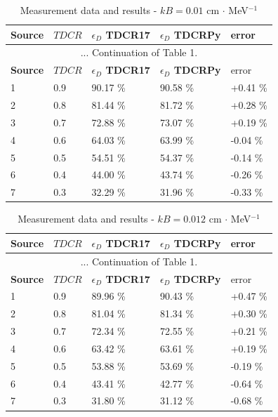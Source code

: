 \documentclass[12pt]{iopart}
\begin{document}
\begingroup
\footnotesize
\begin{longtable}[l]{| p{} | p{} | p{} |p{} |p{} |} 
\caption{Measurement data and results - $kB = 0.01$ cm $\cdot$ MeV$^{-1}$}
\label{Table1} \\ 
\hline
\textbf{Source} & \textbf{$TDCR$} & \textbf{$\epsilon_{D}$ TDCR17} & \textbf{$\epsilon_{D}$ TDCRPy} & error \\ 
\endfirsthead
\multicolumn{5}{c}{... Continuation of Table 1.}\\ 
\hline
 \textbf{Source} & \textbf{$TDCR$} & \textbf{$\epsilon_{D}$ TDCR17} & \textbf{$\epsilon_{D}$ TDCRPy} & error \\   \hline 
\endhead
\hline
 1 &  0.9  &  90.17 \% &   90.58 \% &  +0.41 \% \\
 2 &  0.8  &  81.44 \% &   81.72 \% &  +0.28 \% \\
 3 &  0.7  &  72.88 \% &   73.07 \% &  +0.19 \% \\
 4 &  0.6  &  64.03 \% &   63.99 \% &  -0.04 \% \\
 5 &  0.5  &  54.51 \% &   54.37 \% &  -0.14 \% \\
 6 &  0.4  &  44.00 \% &   43.74 \% &  -0.26 \% \\
 7 &  0.3  &  32.29 \% &   31.96 \% &  -0.33 \% \\
\hline
\end{longtable} 
\endgroup

\begingroup
\footnotesize
\begin{longtable}[l]{| p{} | p{} |p{} |p{} |p{} |} 
\caption{Measurement data and results - $kB = 0.012$ cm $\cdot$ MeV$^{-1}$}
\label{Table1} \\ 
\hline
\textbf{Source} & \textbf{$TDCR$} & \textbf{$\epsilon_{D}$ TDCR17} & \textbf{$\epsilon_{D}$ TDCRPy} & error \\ 
\endfirsthead
\multicolumn{5}{c}{... Continuation of Table 1.}\\ 
\hline
 \textbf{Source} & \textbf{$TDCR$} & \textbf{$\epsilon_{D}$ TDCR17} & \textbf{$\epsilon_{D}$ TDCRPy} & error \\   \hline 
\endhead
\hline
 1 & 0.9   &   89.96 \% &   90.43 \% & +0.47 \% \\
 2 & 0.8   &   81.04 \% &   81.34 \% & +0.30 \% \\
 3 & 0.7   &   72.34 \% &   72.55 \% & +0.21 \% \\
 4 & 0.6   &   63.42 \% &   63.61 \% & +0.19 \% \\
 5 & 0.5   &   53.88 \% &   53.69 \% & -0.19 \% \\
 6 & 0.4   &   43.41 \% &   42.77 \% & -0.64 \% \\
 7 & 0.3   &   31.80 \% &   31.12 \% & -0.68 \% \\
\hline
\end{longtable} 
\endgroup
\end{document}
